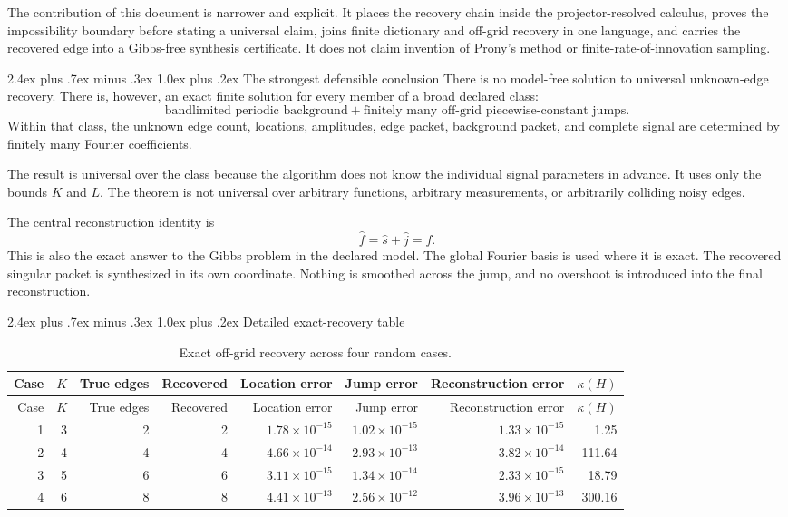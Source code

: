 \documentclass[11pt,oneside]{book}
\makeatletter
\renewcommand\chapter{\@startsection{chapter}{0}{\z@}%
  {2.4ex plus .7ex minus .3ex}%
  {1.0ex plus .2ex}%
  {\normalfont\LARGE\bfseries\color{Ink}}}
\theoremstyle{remark}
\makeatother
\begin{document}
The contribution of this document is narrower and explicit. It places the recovery chain inside the projector-resolved calculus, proves the impossibility boundary before stating a universal claim, joins finite dictionary and off-grid recovery in one language, and carries the recovered edge into a Gibbs-free synthesis certificate. It does not claim invention of Prony's method or finite-rate-of-innovation sampling.

\chapter{The strongest defensible conclusion}
There is no model-free solution to universal unknown-edge recovery. There is, however, an exact finite solution for every member of a broad declared class:
\[
\boxed{
\text{bandlimited periodic background}
+
\text{finitely many off-grid piecewise-constant jumps}.
}
\]
Within that class, the unknown edge count, locations, amplitudes, edge packet, background packet, and complete signal are determined by finitely many Fourier coefficients.

The result is universal over the class because the algorithm does not know the individual signal parameters in advance. It uses only the bounds \(K\) and \(L\). The theorem is not universal over arbitrary functions, arbitrary measurements, or arbitrarily colliding noisy edges.

The central reconstruction identity is
\[
\boxed{
\widehat f
=
\widehat s+\widehat j
=f.
}
\]
This is also the exact answer to the Gibbs problem in the declared model. The global Fourier basis is used where it is exact. The recovered singular packet is synthesized in its own coordinate. Nothing is smoothed across the jump, and no overshoot is introduced into the final reconstruction.

\appendix

\chapter{Detailed exact-recovery table}
\begin{longtable}{rrrrrrrr}
\caption{Exact off-grid recovery across four random cases.}\label{tab:exact-cases}\\
\toprule
Case & \(K\) & True edges & Recovered & Location error & Jump error & Reconstruction error & \(\kappa(H)\)\\
\midrule
\endfirsthead
\toprule
Case & \(K\) & True edges & Recovered & Location error & Jump error & Reconstruction error & \(\kappa(H)\)\\
\midrule
\endhead
1 & 3 & 2 & 2 & \(1.78\times10^{-15}\) & \(1.02\times10^{-15}\) & \(1.33\times10^{-15}\) & 1.25\\
2 & 4 & 4 & 4 & \(4.66\times10^{-14}\) & \(2.93\times10^{-13}\) & \(3.82\times10^{-14}\) & 111.64\\
3 & 5 & 6 & 6 & \(3.11\times10^{-15}\) & \(1.34\times10^{-14}\) & \(2.33\times10^{-15}\) & 18.79\\
4 & 6 & 8 & 8 & \(4.41\times10^{-13}\) & \(2.56\times10^{-12}\) & \(3.96\times10^{-13}\) & 300.16\\
\bottomrule
\end{longtable}
\end{document}
